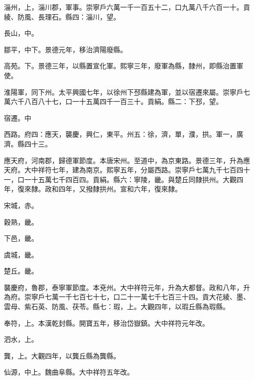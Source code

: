 \begin{pinyinscope}
 淄州，上，淄川郡，軍事。崇寧戶六萬一千一百五十二，口九萬八千六百一十。貢綾、防風、長理石。縣四：淄川，望。



 長山，中。



 鄒平，中下。景德元年，移治濟陽廢縣。



 高苑。下。景德三年，以縣置宣化軍。熙寧三年，廢軍為縣，隸州，即縣治置軍使。



 淮陽軍，同下州。太平興國七年，以徐州下邳縣建為軍，並以宿遷來屬。崇寧戶七萬六千八百八十七，口一十五萬四千一百三十。貢絹。縣二：下邳，望。



 宿遷。中



 西路。府四：應天，襲慶，興仁，東平。州五：徐，濟，單，濮，拱。軍一，廣濟。縣四十三。



 應天府，河南郡，歸德軍節度。本唐宋州。至道中，為京東路。景德三年，升為應天府。大中祥符七年，建為南京。熙寧五年，分屬西路。崇寧戶七萬九千七百四十一，口一十五萬七千四百四。貢絹。縣六：寧陵，畿。與楚丘同隸拱州。大觀四年，復來隸。政和四年，又撥隸拱州。宣和六年，復來隸。



 宋城，赤。



 穀熟，畿。



 下邑，畿。



 虞城，畿。



 楚丘。畿。



 襲慶府，魯郡，泰寧軍節度。本兗州。大中祥符元年，升為大都督。政和八年，升為府。崇寧戶七萬一千七百七十七，口二十一萬七千七百三十四。貢大花綾、墨、雲母、紫石英、防風、茯苓。縣七：瑕，上。大觀四年，以瑕丘縣為瑕縣。



 奉符，上。本漢乾封縣。開寶五年，移治岱嶽鎮。大中祥符元年改。



 泗水，上。



 龔，上。大觀四年，以龔丘縣為龔縣。



 仙源，中上。魏曲阜縣。大中祥符五年改。




\end{pinyinscope}
